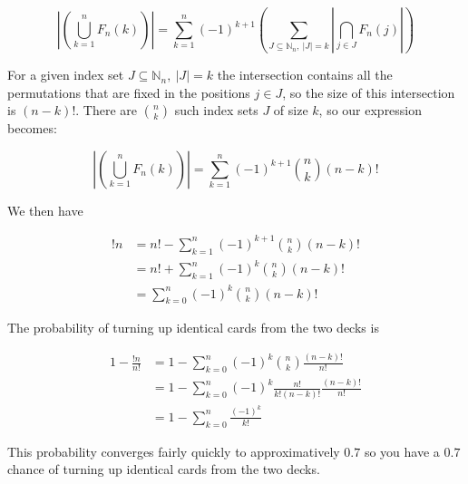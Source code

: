 $$
|(\bigcup_{k = 1}^n F_n(k))| = \sum_{k = 1}^n (-1)^{k + 1} (\sum_{J \subseteq \mathbb{N}_n,\ |J|=k} |\bigcap_{j\in J} F_n(j)|)
$$

For a given index set $J \subseteq \mathbb{N}_n,\ |J|=k$ the intersection contains all the permutations that are fixed in the positions $j \in J$, so the size of this intersection is $(n-k)!$. There are $\binom{n}{k}$ such index sets $J$ of size $k$, so our expression becomes:

$$
|(\bigcup_{k = 1}^n F_n(k))| = \sum_{k = 1}^n (-1)^{k + 1} \binom{n}{k} (n-k)!
$$ 

We then have

$$
\begin{aligned}
!n & = n! - \sum_{k = 1}^n (-1)^{k + 1} \binom{n}{k} (n-k)! \\
   & = n! + \sum_{k = 1}^n (-1)^k \binom{n}{k} (n-k)! \\
   & = \sum_{k = 0}^n (-1)^k \binom{n}{k} (n-k)!
\end{aligned}
$$

The probability of turning up identical cards from the two decks is

$$
\begin{aligned}
1 - \frac{!n}{n!} & = 1 - \sum_{k = 0}^n (-1)^k \binom{n}{k} \frac{(n-k)!}{n!} \\
                  & = 1 - \sum_{k = 0}^n (-1)^k \frac{n!}{k! (n - k)!} \frac{(n-k)!}{n!} \\
                  & = 1 - \sum_{k = 0}^n \frac{(-1)^k}{k!}
\end{aligned}
$$

This probability converges fairly quickly to approximatively $0.7$ so you have a $0.7$ chance of turning up identical cards from the two decks.

